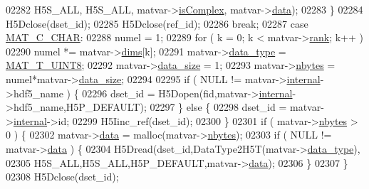 \begin{DoxyCode}
{{{{{{{{{{02282                     H5S\_ALL, H5S\_ALL, matvar->\hyperlink{group___m_a_t_aeb03b3a69f108dc05470b00443a43739}{isComplex}, matvar->\hyperlink{group___m_a_t_a5672978efa230bbdecdf38ede781f7fa}{data});
02283             \}
02284             H5Dclose(dset\_id);
02285             H5Dclose(ref\_id);
02286             \textcolor{keywordflow}{break};
02287         \textcolor{keywordflow}{case} \hyperlink{group___m_a_t_ggad4d60ae7b709fc81bfd744fb4c857c40aacdec5834df0861130b393697646119c}{MAT\_C\_CHAR}:
02288             numel = 1;
02289             \textcolor{keywordflow}{for} ( k = 0; k < matvar->\hyperlink{group___m_a_t_a84ba70c96ded13cc555fa75b768d9921}{rank}; k++ )
02290                 numel *= matvar->\hyperlink{group___m_a_t_a8e01234e1c862ce3472bb37f5a09b92c}{dims}[k];
02291             matvar->\hyperlink{group___m_a_t_ab6aafe9bd77f0f077852593dec438144}{data\_type} = \hyperlink{group___m_a_t_ggacf7b3b879282b7ab3a51190e49bf3453a01c1bd7db68f90552862eb5d311be408}{MAT\_T\_UINT8};
02292             matvar->\hyperlink{group___m_a_t_a9ad1c82e2b568da617e12dc73a26e1f9}{data\_size} = 1;
02293             matvar->\hyperlink{group___m_a_t_abf1c844540503be2df9bb3db93cfe307}{nbytes}    = numel*matvar->\hyperlink{group___m_a_t_a9ad1c82e2b568da617e12dc73a26e1f9}{data\_size};
02294 
02295             if ( NULL != matvar->\hyperlink{group___m_a_t_a6e97e3ed9f40c49322c18561c2a94e92}{internal}->hdf5\_name ) \{
02296                 dset\_id = H5Dopen(fid,matvar->\hyperlink{group___m_a_t_a6e97e3ed9f40c49322c18561c2a94e92}{internal}->hdf5\_name,H5P\_DEFAULT);
02297             \} \textcolor{keywordflow}{else} \{
02298                 dset\_id = matvar->\hyperlink{group___m_a_t_a6e97e3ed9f40c49322c18561c2a94e92}{internal}->id;
02299                 H5Iinc\_ref(dset\_id);
02300             \}
02301             \textcolor{keywordflow}{if} ( matvar->\hyperlink{group___m_a_t_abf1c844540503be2df9bb3db93cfe307}{nbytes} > 0 ) \{
02302                 matvar->\hyperlink{group___m_a_t_a5672978efa230bbdecdf38ede781f7fa}{data} = malloc(matvar->\hyperlink{group___m_a_t_abf1c844540503be2df9bb3db93cfe307}{nbytes});
02303                 \textcolor{keywordflow}{if} ( NULL != matvar->\hyperlink{group___m_a_t_a5672978efa230bbdecdf38ede781f7fa}{data} ) \{
02304                     H5Dread(dset\_id,DataType2H5T(matvar->\hyperlink{group___m_a_t_ab6aafe9bd77f0f077852593dec438144}{data\_type}),
02305                             H5S\_ALL,H5S\_ALL,H5P\_DEFAULT,matvar->\hyperlink{group___m_a_t_a5672978efa230bbdecdf38ede781f7fa}{data});
02306                 \}
02307             \}
02308             H5Dclose(dset\_id);
}}}}}}}}}}
\end{DoxyCode}
